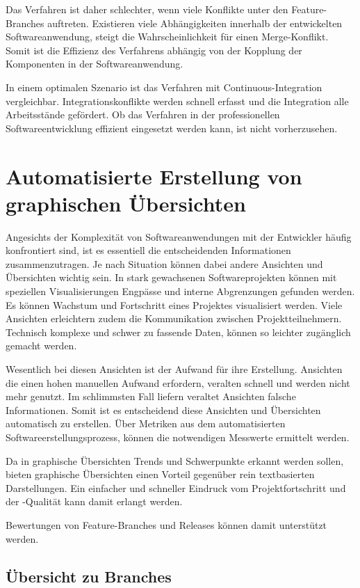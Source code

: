 Das Verfahren ist daher schlechter, wenn viele Konflikte unter den Feature-Branches auftreten. Existieren viele Abhängigkeiten innerhalb der entwickelten Softwareanwendung, steigt die Wahrscheinlichkeit für einen Merge-Konflikt. Somit ist die Effizienz des Verfahrens abhängig von der Kopplung der Komponenten in der Softwareanwendung.

In einem optimalen Szenario ist das Verfahren mit Continuous-Integration vergleichbar. Integrationskonflikte werden schnell erfasst und die Integration alle Arbeitsstände gefördert. Ob das Verfahren in der professionellen Softwareentwicklung effizient eingesetzt werden kann, ist nicht vorherzusehen.

\section{Automatisierte Erstellung von graphischen Übersichten}

Angesichts der Komplexität von Softwareanwendungen mit der Entwickler häufig konfrontiert sind, ist es essentiell die entscheidenden Informationen zusammenzutragen. Je nach Situation können dabei andere Ansichten und Übersichten wichtig sein. In stark gewachsenen Softwareprojekten können mit speziellen Visualisierungen Engpässe und interne Abgrenzungen gefunden werden. Es können Wachstum und Fortschritt eines Projektes visualisiert werden. Viele Ansichten erleichtern zudem die Kommunikation zwischen Projektteilnehmern. Technisch komplexe und schwer zu fassende Daten, können so leichter zugänglich gemacht werden.

Wesentlich bei diesen Ansichten ist der Aufwand für ihre Erstellung. Ansichten die einen hohen manuellen Aufwand erfordern, veralten schnell und werden nicht mehr genutzt. Im schlimmsten Fall liefern veraltet Ansichten falsche Informationen. Somit ist es entscheidend diese Ansichten und Übersichten automatisch zu erstellen. Über Metriken aus dem automatisierten Softwareerstellungsprozess, können die notwendigen Messwerte ermittelt werden. 

Da in graphische Übersichten Trends und Schwerpunkte erkannt werden sollen, bieten graphische Übersichten einen Vorteil gegenüber rein textbasierten Darstellungen. Ein einfacher und schneller Eindruck vom Projektfortschritt und der -Qualität kann damit erlangt werden.

Bewertungen von Feature-Branches und Releases können damit unterstützt werden.

\subsection{Übersicht zu Branches}

